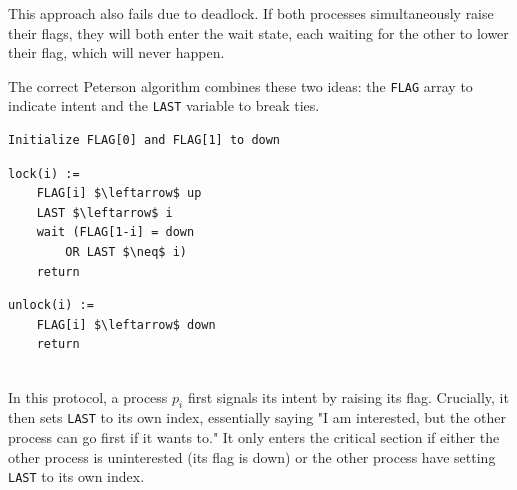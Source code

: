 This approach also fails due to deadlock. If both processes simultaneously raise their flags, they will both enter the wait state, each waiting for the other to lower their flag, which will never happen.

The correct Peterson algorithm combines these two ideas: the \texttt{FLAG} array to indicate intent and the \texttt{LAST} variable to break ties.

\begin{minipage}{\textwidth}
\begin{lstlisting}[mathescape]
Initialize FLAG[0] and FLAG[1] to down
\end{lstlisting}
\begin{minipage}{0.45\textwidth}
\begin{lstlisting}[mathescape]
lock(i) :=
    FLAG[i] $\leftarrow$ up
    LAST $\leftarrow$ i
    wait (FLAG[1-i] = down 
        OR LAST $\neq$ i)
    return
\end{lstlisting}
\end{minipage}
\hfill
\begin{minipage}{0.45\textwidth}
\begin{lstlisting}[mathescape]
unlock(i) :=
    FLAG[i] $\leftarrow$ down
    return
\end{lstlisting}
\end{minipage}
\end{minipage}\\

In this protocol, a process $p_i$ first signals its intent by raising its flag. Crucially, it then sets \texttt{LAST} to its own index, essentially saying "I am interested, but the other process can go first if it wants to." It only enters the critical section if either the other process is uninterested (its flag is down) or the other process have setting \texttt{LAST} to its own index.\\


